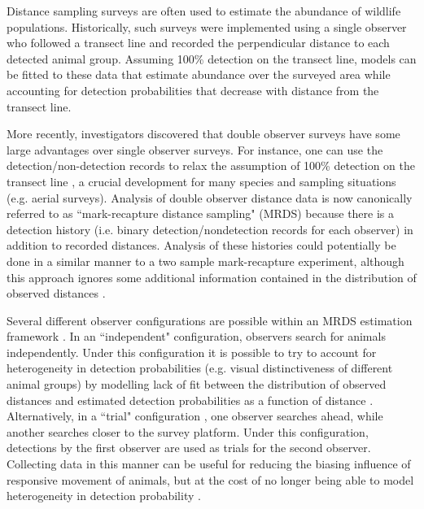 \documentclass[12pt,fleqn]{article}
\begin{document}
Distance sampling surveys \citep{BurnhamEtAl1980,BucklandEtAl2001} are often used to estimate the abundance of wildlife populations.  Historically, such surveys were implemented using a single observer who followed a transect line and recorded the perpendicular distance to each detected animal group.  Assuming 100\% detection on the transect line, models can be fitted to these data that estimate abundance over the surveyed area while accounting for detection probabilities that decrease with distance from the transect line.

More recently, investigators discovered that double observer surveys have some large advantages over single observer surveys.  For instance, one can use the detection/non-detection records to relax the assumption of 100\% detection on the transect line \citep{BorchersEtAl1998}, a crucial development for many species and sampling situations (e.g. aerial surveys).  Analysis of double observer distance data is now canonically referred to as ``mark-recapture distance sampling" (MRDS) because there is a detection history (i.e. binary detection/nondetection records for each observer) in addition to recorded distances. Analysis of these histories could potentially be done in a similar manner to a two sample mark-recapture experiment, although this approach ignores some additional information contained in the distribution of observed distances \citep{LaakeBorchers2004}.

Several different observer configurations are possible within an MRDS estimation framework \citep{BurtEtAl2014}.  In an ``independent" configuration, observers search for animals independently.  Under this configuration it is possible to try to account for heterogeneity in detection probabilities (e.g. visual distinctiveness of different animal groups) by modelling lack of fit between the distribution of observed distances and estimated detection probabilities as a function of distance \citep{LaakeBorchers2004,BorchersEtAl2006,BucklandEtAl2010}.   Alternatively, in a ``trial" configuration \citep{LaakeBorchers2004}, one observer searches ahead, while another searches closer to the survey platform.  Under this configuration, detections by the first observer are used as trials for the second observer.  Collecting data in this manner can be useful for reducing the biasing influence of responsive movement of animals, but at the cost of no longer being able to model heterogeneity in detection probability \citep{BurtEtAl2014}.
\end{document}
